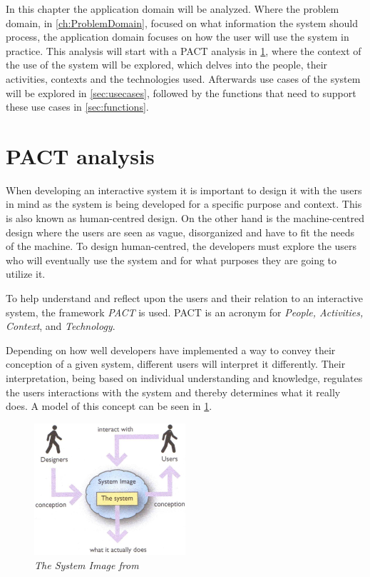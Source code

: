 In this chapter the application domain will be analyzed.
Where the problem domain, in \cref{ch:ProblemDomain}, focused on what information the system should process, the application domain focuses on how the user will use the system in practice.
This analysis will start with a PACT \cite{Benyon} analysis in \cref{sec:PACT}, where the context of the use of the system will be explored, which delves into the people, their activities, contexts and the technologies used.
Afterwards use cases of the system will be explored in \cref{sec:usecases}, followed by the functions that need to support these use cases in \cref{sec:functions}.

\section{PACT analysis}\label{sec:PACT}
When developing an interactive system it is important to design it with the users in mind as the system is being developed for a specific purpose and context.
This is also known as human-centred design.
On the other hand is the machine-centred design where the users are seen as vague, disorganized and have to fit the needs of the machine.
To design human-centred, the developers must explore the users who will eventually use the system and for what purposes they are going to utilize it.

To help understand and reflect upon the users and their relation to an interactive system, the framework \textit{PACT} is used.
PACT is an acronym for \textit{People, Activities, Context}, and \textit{Technology}.

Depending on how well developers have implemented a way to convey their conception of a given system, different users will interpret it differently.
Their interpretation, being based on individual understanding and knowledge, regulates the users interactions with the system and thereby determines what it really does.
A model of this concept can be seen in \cref{fig:PACT-SystemImage}.

\begin{figure}[H]
	\centering
	\includegraphics[width=0.5\textwidth]{billeder/SystemImage-Benyon.jpg}
	\caption{\textit{The System Image from \citep[p.~31]{Benyon}}}
	\label{fig:PACT-SystemImage}
\end{figure}

